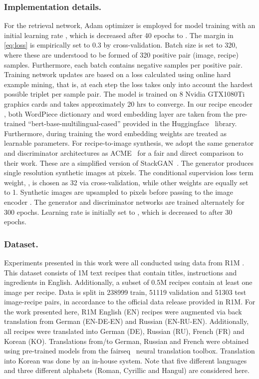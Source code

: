 \documentclass[sigconf,nonacm]{acmart}
\begin{document}
\subsubsection*{\textbf{Implementation details.}} For the retrieval network, Adam optimizer \cite{adam} is employed for model training with an initial learning rate , which is decreased after 40 epochs to . The margin  in \autoref{eq:loss} is empirically set to 0.3 by cross-validation. Batch size is set to 320, where these are understood to be formed of 320 positive pair (image, recipe) samples. Furthermore, each batch contains  negative samples per positive pair. Training network updates are based on a loss calculated using online hard example mining, that is, at each step the loss takes only into account the hardest possible triplet per sample pair. The model is trained on 8 Nvidia GTX1080Ti graphics cards and takes approximately 20 hrs to converge. In our recipe encoder , both WordPiece dictionary and word embedding layer are taken from the pre-trained ``bert-base-multilingual-cased'' provided in the Huggingface~\cite{huggingface} library. Furthermore, during training the word embedding weights are treated as learnable parameters. For recipe-to-image synthesis, we adopt the same generator and discriminator architectures as ACME~\cite{wang2019} for a fair and direct comparison to their work. These are a simplified version of StackGAN~\cite{Zhang2017-jm}. The generator produces single resolution synthetic images at  pixels. The conditional supervision loss term weight, , is chosen as 32 via cross-validation, while other weights are equally set to 1. Synthetic images are upsampled to  pixels before passing to the image encoder . The generator and discriminator networks are trained alternately for 300 epochs. Learning rate is initially set to , which is decreased to  after 30 epochs.

\subsubsection*{\textbf{Dataset.}}
Experiments presented in this work were all conducted using data from R1M \cite{salvador2017,marin2019}. This dataset consists of 1M text recipes that contain titles, instructions and ingredients in English. Additionally, a subset of 0.5M recipes contain at least one image per recipe. Data is split in 238999 train, 51119 validation and 51303 test image-recipe pairs, in accordance to the official data release provided in R1M. For the work presented here, R1M English (EN) recipes were augmented via back translation from German (EN-DE-EN) and Russian (EN-RU-EN). Additionally, all recipes were translated into German (DE), Russian (RU), French (FR) and Korean (KO). Translations from/to German, Russian and French were obtained using pre-trained models from the fairseq~\cite{ott2019fairseq} neural translation toolbox. Translation into Korean was done by an in-house system. Note that five different languages and three different alphabets (Roman, Cyrillic and Hangul) are considered here.
\end{document}
